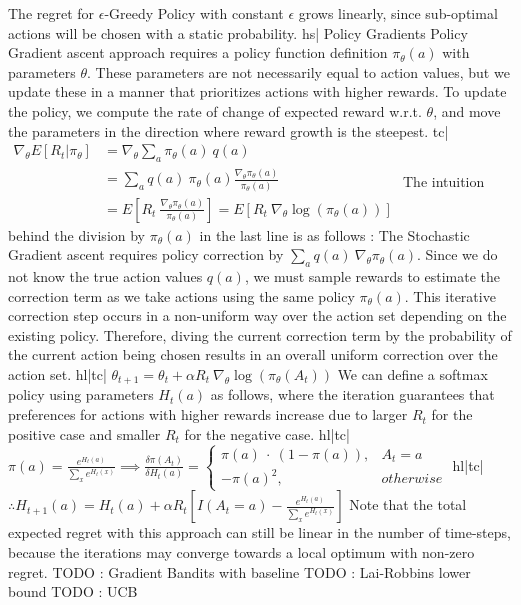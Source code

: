The regret for \(\epsilon\)-Greedy Policy with constant \(\epsilon\) grows linearly, since sub-optimal actions will be chosen with a static probability.
hs| Policy Gradients
Policy Gradient ascent approach requires a policy function definition \(\pi_\theta(a)\) with parameters \(\theta\). These parameters are not necessarily equal to action values, but we update these in a manner that prioritizes actions with higher rewards. To update the policy, we compute the rate of change of expected reward w.r.t. \(\theta\), and move the parameters in the direction where reward growth is the steepest.
tc| \( \begin{aligned} \nabla_\theta E[R_t | \pi_\theta] &= \nabla_\theta \sum_a \pi_\theta(a) \ q(a) \\ &= \sum_a q(a) \ \pi_\theta(a) \frac{\nabla_\theta \pi_\theta(a)}{\pi_\theta(a)} \\ &= E\left[R_t \ \frac{\nabla_\theta \pi_\theta(a)}{\pi_\theta(a)} \right] = E\left[ R_t \ \nabla_\theta \log(\pi_\theta(a)) \right] \end{aligned} \)
The intuition behind the division by \(\pi_\theta(a)\) in the last line is as follows : The Stochastic Gradient ascent requires policy correction by \(\sum_a q(a) \ \nabla_\theta \pi_\theta(a) \). Since we do not know the true action values \(q(a)\), we must sample rewards to estimate the correction term as we take actions using the same policy \(\pi_\theta(a)\). This iterative correction step occurs in a non-uniform way over the action set depending on the existing policy. Therefore, diving the current correction term by the probability of the current action being chosen results in an overall uniform correction over the action set.
hl|tc| \( \theta_{t+1} = \theta_t + \alpha R_t \ \nabla_\theta \log(\pi_\theta(A_t)) \)
We can define a softmax policy using parameters \(H_t(a)\) as follows, where the iteration guarantees that preferences for actions with higher rewards increase due to larger \(R_t\) for the positive case and smaller \(R_t\) for the negative case.
hl|tc| \( \pi(a) = \frac{e^{H_t(a)}}{\sum_x e^{H_t(x)}} \implies \frac{\delta \pi(A_t)}{\delta H_t(a)} = \begin{cases} \pi(a) \ \cdot \ (1 - \pi(a)), & A_t=a \\ - \pi(a)^2, & otherwise \end{cases} \)
hl|tc| \( \therefore H_{t+1}(a) = H_t(a) + \alpha R_t \left[I(A_t=a) - \frac{e^{H_t(a)}}{\sum_x e^{H_t(x)}}\right] \)
Note that the total expected regret with this approach can still be linear in the number of time-steps, because the iterations may converge towards a local optimum with non-zero regret.
TODO : Gradient Bandits with baseline
TODO : Lai-Robbins lower bound
TODO : UCB
